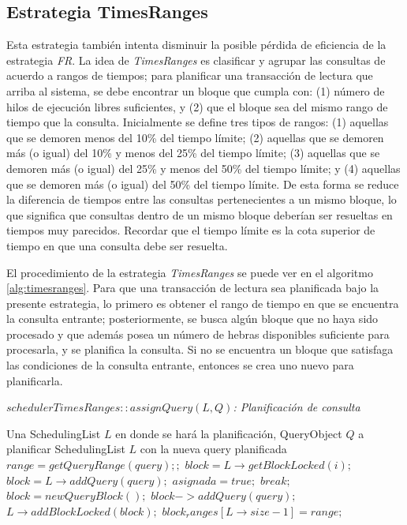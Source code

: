 \subsection{Estrategia TimesRanges}
\label{scheduling:timesranges}
Esta estrategia también intenta disminuir la posible pérdida de eficiencia de la estrategia \textit{FR}. La idea de \textit{TimesRanges} es clasificar y agrupar las consultas de acuerdo a rangos de tiempos; para planificar una transacción de lectura que arriba al sistema, se debe encontrar un bloque que cumpla con: (1) número de hilos de ejecución libres suficientes, y (2) que el bloque sea del mismo rango de tiempo que la consulta. Inicialmente se define tres tipos de rangos: (1) aquellas que se demoren menos del 10\% del tiempo límite; (2) aquellas que se demoren más (o igual) del 10\% y menos del 25\% del tiempo límite; (3) aquellas que se demoren más (o igual) del 25\% y menos del 50\% del tiempo límite; y (4) aquellas que se demoren más (o igual) del 50\% del tiempo límite. De esta forma se reduce la diferencia de tiempos entre las consultas pertenecientes a un mismo bloque, lo que significa que consultas dentro de un mismo bloque deberían ser resueltas en tiempos muy parecidos. Recordar que el tiempo límite es la cota superior de tiempo en que una consulta debe ser resuelta.

El procedimiento de la estrategia \textit{TimesRanges} se puede ver en el algoritmo \ref{alg:timesranges}. Para que una transacción de lectura sea planificada bajo la presente estrategia, lo primero es obtener el rango de tiempo en que se encuentra la consulta entrante; posteriormente, se busca algún bloque que no haya sido procesado y que además posea un número de hebras disponibles suficiente para procesarla, y se planifica la consulta. Si no se encuentra un bloque que satisfaga las condiciones de la consulta entrante, entonces se crea uno nuevo para planificarla. 

\begin{algorithm}[!th]
\caption{\em $schedulerTimesRanges::assignQuery(L, Q)$: Planificación de consulta}
\label{alg:timesranges}
\begin{algorithmic}[1]
\REQUIRE Una SchedulingList $L$ en donde se hará la planificación, QueryObject $Q$ a planificar
\ENSURE SchedulingList $L$ con la nueva query planificada	
	\STATE $range = getQueryRange(query);;$		
		\STATE $block = L \rightarrow getBlockLocked(i);$	
			\STATE $block = L \rightarrow addQuery(query);$
			\STATE $asignada = true;$
			\STATE $break;$	
		\ENDIF
	\ENDFOR
		\STATE $block = new QueryBlock();$	
		\STATE $block->addQuery(query);$	
		\STATE $L \rightarrow addBlockLocked(block);$
		\STATE $block_ranges[L \rightarrow size - 1] = range;$	
	\ENDIF
\end{algorithmic}
\end{algorithm}


